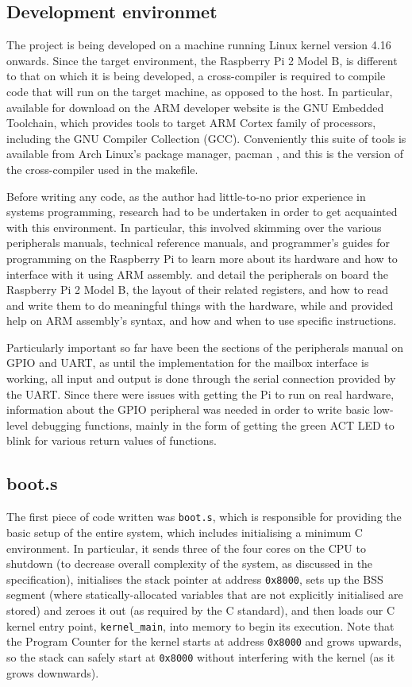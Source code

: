 \documentclass[10pt,a4paper]{article}
\newcommand{\code}[1]{\texttt{#1}}
\begin{document}
\subsection*{Development environmet}
The project is being developed on a machine running Linux kernel version 4.16
onwards. Since the target environment, the Raspberry Pi 2 Model B, is different
to that on which it is being developed, a cross-compiler is required to compile
code that will run on the target machine, as opposed to the host. In particular,
available for download on the ARM developer website \cite{GNUtoolchain} is the
GNU Embedded Toolchain, which provides tools to target ARM Cortex family of
processors, including the GNU Compiler Collection (GCC). Conveniently this suite
of tools is available from Arch Linux's package manager, pacman \cite{pacman},
and this is the version of the cross-compiler used in the makefile.

Before writing any code, as the author had little-to-no prior experience in
systems programming, research had to be undertaken in order to get acquainted
with this environment. In particular, this involved skimming over the various
peripherals manuals, technical reference manuals, and programmer's guides for
programming on the Raspberry Pi to learn more about its hardware and how to
interface with it using ARM assembly. \cite{BCM2835} and \cite{BCM2836} detail the
peripherals on board the Raspberry Pi 2 Model B, the layout of their related
registers, and how to read and write them to do meaningful things with the
hardware, while \cite{TRM} and \cite{PG} provided help on ARM assembly's syntax,
and how and when to use specific instructions.

Particularly important so far have been the sections of the peripherals manual
on GPIO and UART, as until the implementation for the mailbox interface is
working, all input and output is done through the serial connection provided by
the UART.  Since there were issues with getting the Pi to run on real hardware,
information about the GPIO peripheral was needed in order to write basic
low-level debugging functions, mainly in the form of getting the green ACT LED
to blink for various return values of functions.

\subsection*{boot.s}
The first piece of code written was \code{boot.s}, which is responsible for
providing the basic setup of the entire system, which includes initialising a
minimum C environment. In particular, it sends three of the four cores on the
CPU to shutdown (to decrease overall complexity of the system, as discussed in
the specification), initialises the stack pointer at address \code{0x8000}, sets
up the BSS segment (where statically-allocated variables that are not explicitly
initialised are stored) and zeroes it out (as required by the C standard), and
then loads our C kernel entry point, \code{kernel\_main}, into memory to begin
its execution. Note that the Program Counter for the kernel starts at address
\code{0x8000} and grows upwards, so the stack can safely start at \code{0x8000}
without interfering with the kernel (as it grows downwards).
\end{document}
